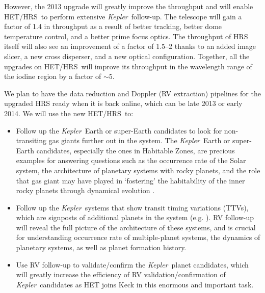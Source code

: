\documentclass[12pt]{article}
\def\kepler{{\it Kepler}}
\def\hrs{HET/HRS}
\begin{document}
However, the 2013 upgrade will greatly improve the throughput and will
enable \hrs\ to perform extensive \kepler\ follow-up. The telescope
will gain a factor of 1.4 in throughput as a result of better
tracking, better dome temperature control, and a better prime focus
optics. The throughput of HRS itself will also see an improvement of a
factor of 1.5--2 thanks to an added image slicer, a new cross
disperser, and a new optical configuration. Together, all the upgrades
on \hrs\ will improve its throughput in the wavelength range of the
iodine region by a factor of $\sim$5.

We plan to have the data reduction and Doppler (RV extraction)
pipelines for the upgraded HRS ready when it is back online, which can
be late 2013 or early 2014. We will use the new \hrs\ to:
\begin{itemize}[leftmargin=1.5em]
      \vspace{-3pt}
  \item Follow up the \kepler\ Earth or super-Earth candidates to look
    for non-transiting gas giants further out in the system. The
    \kepler\ Earth or super-Earth candidates, especially the ones in
    Habitable Zones, are precious examples for answering questions
    such as the occurrence rate of the Solar system, the architecture
    of planetary systems with rocky planets, and the role that gas
    giant may have played in `fostering' the habitability of the inner
    rocky planets through dynamical evolution \citep{wetherill1994,horner2008}.
        \vspace{-3pt}
  \item Follow up the \kepler\ systems that show transit timing
    variations (TTVs), which are signposts of additional planets in the system
    (e.g. \citealt{steffen2013}). RV follow-up will reveal the full picture of
    the architecture of these systems, and is crucial for
    understanding occurrence rate of multiple-planet systems, the
    dynamics of planetary systems, as well as planet formation
    history.
        \vspace{-3pt}
  \item Use RV follow-up to validate/confirm the \kepler\ planet
    candidates, which will greatly increase the efficiency of RV
    validation/confirmation of \kepler\ candidates as HET joins Keck
    in this enormous and important task.
        \vspace{-3pt}
\end{itemize}
\end{document}
